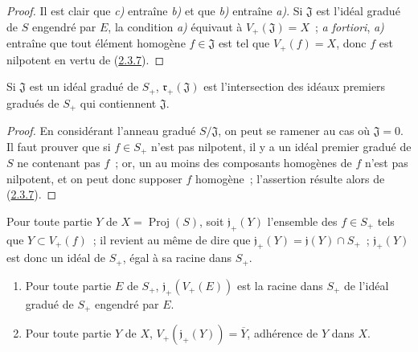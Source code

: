 \begin{proof}
Il est clair que \emph{c)} entraîne \emph{b)} et que \emph{b)} entraîne \emph{a)}. Si $\mathfrak{J}$ est
l'idéal gradué de $S$ engendré par $E$, la condition \emph{a)} équivaut à
$V_+(\mathfrak{J})=X$~; \emph{a fortiori}, \emph{a)} entraîne que tout élément
homogène $f\in\mathfrak{J}$ est tel que $V_+(f)=X$, donc $f$ est nilpotent
en vertu de (\hyperref[II.2.3.7-fr]{2.3.7}).
\end{proof}

\begin{corollary}[2.3.9]
\label{II.2.3.9-fr}
Si $\mathfrak{J}$ est un idéal gradué de $S_+$,
$\mathfrak{r}_+(\mathfrak{J})$ est l'intersection des idéaux premiers gradués de
$S_+$ qui contiennent $\mathfrak{J}$.
\end{corollary}

\begin{proof}
En considérant l'anneau gradué $S/\mathfrak{J}$, on peut se ramener au cas
où $\mathfrak{J}=0$. Il faut prouver que si $f\in S_+$ n'est pas
nilpotent, il y a un idéal premier gradué de $S$ ne contenant pas $f$~; or,
un au moins des composants homogènes de $f$ n'est pas nilpotent, et on peut
donc supposer $f$ homogène~; l'assertion résulte alors de
(\hyperref[II.2.3.7-fr]{2.3.7}).
\end{proof}

\begin{env}[2.3.10]
\label{II.2.3.10-fr}
Pour toute partie $Y$ de $X=\operatorname{Proj}(S)$, soit
$\mathfrak{j}_+(Y)$ l'ensemble des $f\in S_+$ tels que
$Y\subset V_+(f)$~; il revient au même de dire que
$\mathfrak{j}_+(Y)=\mathfrak{j}(Y)\cap S_+$~; $\mathfrak{j}_+(Y)$ est
donc un idéal de $S_+$, égal à sa racine dans $S_+$.
\end{env}

\begin{proposition}[2.3.11]
\label{II.2.3.11-fr}
\begin{enumerate}
  \item[\rm(i)] Pour toute partie $E$ de $S_+$,
    $\mathfrak{j}_+(V_+(E))$ est la racine dans $S_+$ de l'idéal gradué de
    $S_+$ engendré par $E$.
  \item[\rm(ii)] Pour toute partie $Y$ de $X$,
    $V_+(\mathfrak{j}_+(Y))=\overline{Y}$, adhérence de $Y$ dans $X$.
\end{enumerate}
\end{proposition}

